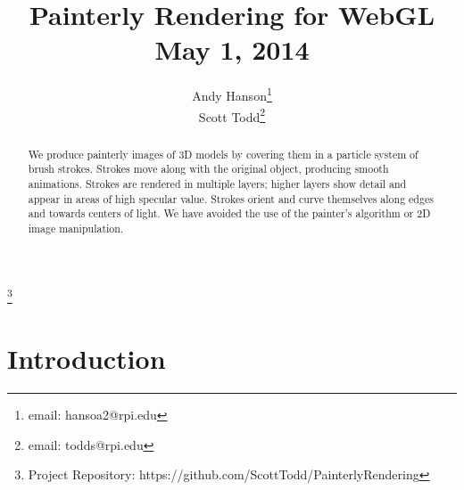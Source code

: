 \documentclass[conference]{acmsiggraph}
\title{Painterly Rendering for WebGL \\ May 1, 2014}
\author{Andy Hanson\thanks{email: hansoa2@rpi.edu}\\
        Scott Todd\thanks{email: todds@rpi.edu}}
\newcommand\blfootnote[1]{%
  \begingroup
  \renewcommand\thefootnote{}\footnote{#1}%
  \addtocounter{footnote}{-1}%
  \endgroup
}
\begin{document}

\maketitle


\begin{abstract}

We produce painterly images of 3D models by covering them in a particle system
of brush strokes. Strokes move along with the original object, producing smooth
animations. Strokes are rendered in multiple layers; higher layers show detail
and appear in areas of high specular value. Strokes orient and curve themselves
along edges and towards centers of light. We have avoided the use of the
painter's algorithm or 2D image manipulation.

\end{abstract}



\keywordlist


\TOGlinkslist

\blfootnote{Project Repository: https://github.com/ScottTodd/PainterlyRendering}

\copyrightspace


\section{Introduction}
\end{document}
